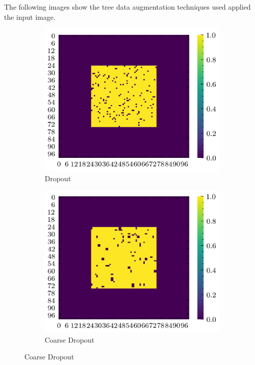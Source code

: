 \documentclass[../document.tex]{subfiles}
\begin{document}
The following images show the tree data augmentation techniques used applied the input image.
\begin{figure}[H]
    \centering
        \begin{subfigure}[b]{0.45\textwidth}
            \includegraphics[width=\textwidth]{../img/data-aug/2d/center-dropout.png}
            \caption{Dropout}
        \end{subfigure}
        \begin{subfigure}[b]{0.45\linewidth}
            \includegraphics[width=\textwidth]{../img/data-aug/2d/center-coarse-dropout.png}
            \caption{Coarse Dropout}
            \end{subfigure}    


\end{figure}
\end{document}
